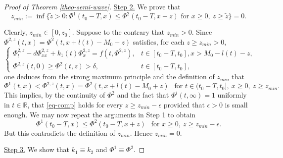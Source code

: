\documentclass[11pt]{amsart}
\numberwithin{equation}{section}
\begin{document}
\begin{proof}[Proof of Theorem \ref{theo-semi-wave}]
\underline{Step 2.} We prove that
\begin{equation*}
  z_{min}:=\inf\{\tilde{z}>0:\Phi^1(t_0-T,x)\leq \Phi^2(t_0-T,x+z) \text{ for } x\geq 0,\ z\geq \tilde{z}\}=0.
\end{equation*}

Clearly, $z_{min}\in [0,z_0]$.   Suppose to the contrary that $z_{min}>0$.  Since   $\Phi^{2,z}(t,x)=\Phi^2(t,x+l(t)-M_0+z)$  satisfies, for each $z\geq z_{min}>0$,
\begin{equation*}
  \begin{cases}
    \Phi^{2,z}_t-d\Phi^{2,z}_{xx}+k_1(t)\Phi^{2,z}_x=f(t,\Phi^{2,z}), &t\in[t_0-T,t_0], x>M_0-l(t)-z, \\
    \Phi^{2,z}(t,0)\geq \Phi^2(t,z)> \delta, &t\in[t_0-T,t_0],
  \end{cases}
\end{equation*}
one deduces from the strong maximum principle and the definition of $z_{min}$ that 
\begin{equation*}
  \Phi^1(t,x)<\Phi^{2,z}(t,x)= \Phi^2(t,x+l(t)-M_0+z)~~ \text{ for }t\in(t_0-T,t_0],\ x\geq 0,\ z\geq z_{min}.
\end{equation*} 
This implies, by the continuity of $\Phi^2$ and the fact that $\Phi^i(t,\infty)=1$ uniformly in $t\in\mathbb R$, that   \eqref{eq-comp} holds  for every $z\geq z_{min}-\epsilon$ provided that $\epsilon>0$ is small enough. We may now repeat the arguments in  Step 1 to obtain
\begin{equation*}
  \Phi^1(t_0-T,x)\leq \Phi^2(t_0-T,x+z)~~ \text{ for } x\geq 0,\ z\geq z_{min}-\epsilon.
\end{equation*}
But this contradicts the definition of $z_{min}$. Hence $z_{min}=0$.



\underline{Step 3.} We show that  $k_1\equiv k_2$ and $\Phi^1\equiv \Phi^2$.


\end{proof}
\end{document}
